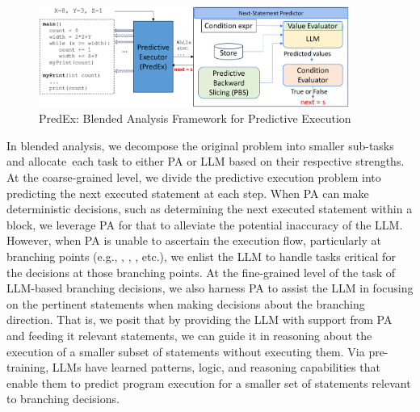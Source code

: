 \begin{figure}
\begin{center}
\includegraphics[width=4in]{overview-4.png}
\vspace{-22pt}
\caption{PredEx: Blended Analysis Framework for Predictive Execution}
\label{fig:overview}
\end{center}
\end{figure}

In blended analysis, we decompose the original problem into smaller sub-tasks and allocate~each task to either PA or LLM based on their respective strengths. At the coarse-grained level, we divide the predictive execution problem into predicting the next executed statement at each step. When PA can make deterministic decisions, such as determining the next executed statement within a block, we leverage PA for that to alleviate the potential inaccuracy of the LLM. However, when PA is unable to ascertain the execution flow, particularly at branching points (e.g., , , , etc.), we enlist the LLM to handle tasks critical for the decisions at those branching points. At the fine-grained level of the task of LLM-based branching decisions, we also harness PA to assist the LLM in focusing on the pertinent statements when making decisions about the branching direction. That is, we posit that by providing the LLM with support from PA and feeding it relevant statements, we can guide it in reasoning about the execution of a smaller subset of statements without executing them. Via pre-training, LLMs have learned patterns, logic, and reasoning capabilities that enable them to predict program execution for a smaller set of statements relevant to branching decisions.

